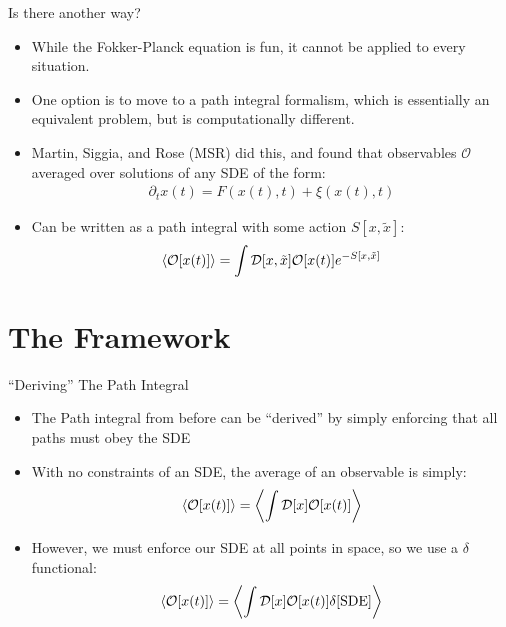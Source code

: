 \documentclass{beamer}
\def\D{\partial}
\begin{document}
\begin{frame}{Is there another way?}
  \begin{itemize}
  \item While the Fokker-Planck equation is fun, it cannot be applied to every situation.
  \item One option is to move to a path integral formalism, which is essentially an equivalent problem, but is computationally different.
  \item Martin, Siggia, and Rose (MSR) did this, and found that observables $\mathcal{O}$ averaged over solutions of any SDE of the form:
    \begin{align*}
      \D_t x(t)=F(x(t),t)+\xi(x(t),t)
    \end{align*}
  \item Can be written as a path integral with some action $S[x,\tilde{x}]$:
    \begin{align*}
      \ev{\mathcal{O}[x(t)]}=\int\mathcal{D}[x,\tilde{x}]\mathcal{O}[x(t)]
      e^{-S[x,\tilde{x}]}
    \end{align*}
  \end{itemize}
\end{frame}

\section{The Framework}
\begin{frame}{``Deriving'' The Path Integral}
  \begin{itemize}
  \item The Path integral from before can be ``derived'' by simply enforcing that all paths must obey the SDE
  \item With no constraints of an SDE, the average of an observable is simply:
    \begin{align*}
      \ev{\mathcal{O}[x(t)]}=\ev{\int\mathcal{D}[x]\mathcal{O}[x(t)]}
    \end{align*}
  \item However, we must enforce our SDE at all points in space, so we use a $\delta$ functional:
    \begin{align*}
      \ev{\mathcal{O}[x(t)]}=\ev{\int\mathcal{D}[x]\mathcal{O}[x(t)]
        \delta[\text{SDE}]}
    \end{align*}
  \end{itemize}
\end{frame}
\end{document}
